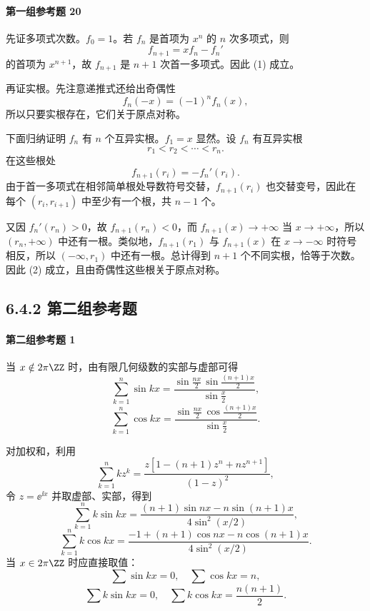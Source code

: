 \paragraph{第一组参考题 20}
\begin{xsolution}
先证多项式次数。$f_0=1$。若 $f_n$ 是首项为 $x^n$ 的 $n$ 次多项式，则
\[
  f_{n+1}=xf_n-f_n'
\]
的首项为 $x^{n+1}$，故 $f_{n+1}$ 是 $n+1$ 次首一多项式。因此 (1) 成立。

再证实根。先注意递推式还给出奇偶性
\[
  f_n(-x)=(-1)^nf_n(x),
\]
所以只要实根存在，它们关于原点对称。

下面归纳证明 $f_n$ 有 $n$ 个互异实根。$f_1=x$ 显然。设 $f_n$ 有互异实根
\[
  r_1<r_2<\cdots<r_n.
\]
在这些根处
\[
  f_{n+1}(r_i)=-f_n'(r_i).
\]
由于首一多项式在相邻简单根处导数符号交替，$f_{n+1}(r_i)$ 也交替变号，因此在每个 $(r_i,r_{i+1})$ 中至少有一个根，共 $n-1$ 个。

又因 $f_n'(r_n)>0$，故 $f_{n+1}(r_n)<0$，而 $f_{n+1}(x)\to+\infty$ 当 $x\to+\infty$，所以 $(r_n,+\infty)$ 中还有一根。类似地，$f_{n+1}(r_1)$ 与 $f_{n+1}(x)$ 在 $x\to-\infty$ 时符号相反，所以 $(-\infty,r_1)$ 中还有一根。总计得到 $n+1$ 个不同实根，恰等于次数。因此 (2) 成立，且由奇偶性这些根关于原点对称。
\end{xsolution}

\subsection*{6.4.2 第二组参考题}

\paragraph{第二组参考题 1}
\begin{xsolution}
当 $x\notin2\pi\ZZ$ 时，由有限几何级数的实部与虚部可得
\[
  \boxed{\sum_{k=1}^n\sin kx
  =\frac{\sin\frac{nx}{2}\,\sin\frac{(n+1)x}{2}}{\sin\frac x2}},
\]
\[
  \boxed{\sum_{k=1}^n\cos kx
  =\frac{\sin\frac{nx}{2}\,\cos\frac{(n+1)x}{2}}{\sin\frac x2}}.
\]

对加权和，利用
\[
  \sum_{k=1}^n kz^k
  =\frac{z[1-(n+1)z^n+nz^{n+1}]}{(1-z)^2},
\]
令 $z=\ee^{\ii x}$ 并取虚部、实部，得到
\[
  \boxed{\sum_{k=1}^n k\sin kx
  =\frac{(n+1)\sin nx-n\sin(n+1)x}{4\sin^2(x/2)}},
\]
\[
  \boxed{\sum_{k=1}^n k\cos kx
  =\frac{-1+(n+1)\cos nx-n\cos(n+1)x}{4\sin^2(x/2)}}.
\]
当 $x\in2\pi\ZZ$ 时应直接取值：
\[
  \sum\sin kx=0,\quad \sum\cos kx=n,
\]
\[
  \sum k\sin kx=0,\quad \sum k\cos kx=\frac{n(n+1)}2.
\]
\end{xsolution}

